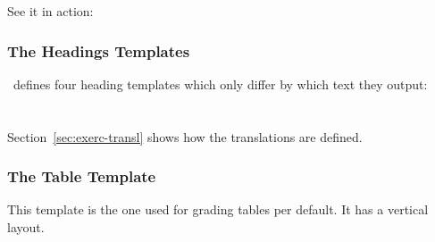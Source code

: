 \documentclass{xsim-manual}
\begin{document}
See it in action:
\begin{example}
  \renewcommand*\theexercise{\arabic{exercise}.}
  \begin{exercise}[subtitle=exsheets' margin,points=2.5]
    \lipsum[4]
  \end{exercise}
\end{example}

\subsubsection{The Headings Templates}\label{sec:headings-templates}
\xsim\ defines four heading templates which only differ by which text they
output:
\begin{sourcecode}
    {\section*{}}
    {\section*{}}
    {\section*{}}
    {\section*{}}
\end{sourcecode}
Section~\vref{sec:exerc-transl} shows how the translations are defined.

\subsubsection{The  Table Template}\label{sec:table-templ-default}
This template is the one used for grading tables per default.  It has a
vertical layout.
\end{document}
